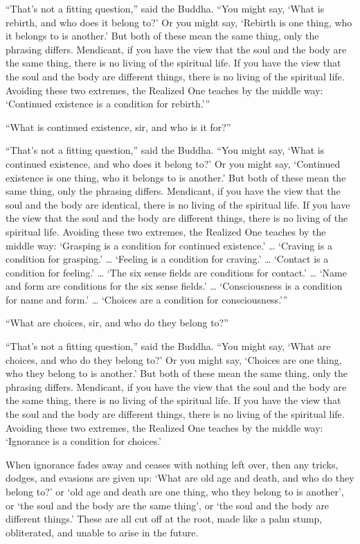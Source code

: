 \documentclass[12pt,openany]{book}%
\begin{document}
“That’s not a fitting question,” said the Buddha. “You might say, ‘What is rebirth, and who does it belong to?’ Or you might say, ‘Rebirth is one thing, who it belongs to is another.’ But both of these mean the same thing, only the phrasing differs. Mendicant, if you have the view that the soul and the body are the same thing, there is no living of the spiritual life. If you have the view that the soul and the body are different things, there is no living of the spiritual life. Avoiding these two extremes, the Realized One teaches by the middle way: ‘Continued existence is a condition for rebirth.’” 

“What is continued existence, sir, and who is it for?” 

“That’s not a fitting question,” said the Buddha. “You might say, ‘What is continued existence, and who does it belong to?’ Or you might say, ‘Continued existence is one thing, who it belongs to is another.’ But both of these mean the same thing, only the phrasing differs. Mendicant, if you have the view that the soul and the body are identical, there is no living of the spiritual life. If you have the view that the soul and the body are different things, there is no living of the spiritual life. Avoiding these two extremes, the Realized One teaches by the middle way: ‘Grasping is a condition for continued existence.’ … ‘Craving is a condition for grasping.’ … ‘Feeling is a condition for craving.’ … ‘Contact is a condition for feeling.’ … ‘The six sense fields are conditions for contact.’ … ‘Name and form are conditions for the six sense fields.’ … ‘Consciousness is a condition for name and form.’ … ‘Choices are a condition for consciousness.’” 

“What are choices, sir, and who do they belong to?” 

“That’s not a fitting question,” said the Buddha. “You might say, ‘What are choices, and who do they belong to?’ Or you might say, ‘Choices are one thing, who they belong to is another.’ But both of these mean the same thing, only the phrasing differs. Mendicant, if you have the view that the soul and the body are the same thing, there is no living of the spiritual life. If you have the view that the soul and the body are different things, there is no living of the spiritual life. Avoiding these two extremes, the Realized One teaches by the middle way: ‘Ignorance is a condition for choices.’ 

When ignorance fades away and ceases with nothing left over, then any tricks, dodges, and evasions are given up: ‘What are old age and death, and who do they belong to?’ or ‘old age and death are one thing, who they belong to is another’, or ‘the soul and the body are the same thing’, or ‘the soul and the body are different things.’ These are all cut off at the root, made like a palm stump, obliterated, and unable to arise in the future. 
\end{document}
